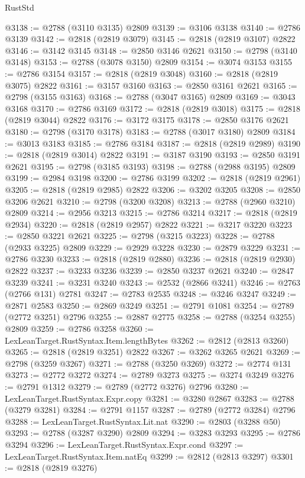 \begin{lexlean}{RustStd}
\begin{coremodule}
@3138 := @2788 (@3110 @3135) @2809
@3139 := @3106 @3138
@3140 := @2786 @3139
@3142 := @2818 (@2819 @3079)
@3145 := @2818 (@2819 @3107) @2822
@3146 := @3142 @3145
@3148 := @2850 @3146 @2621
@3150 := @2798 (@3140 @3148)
@3153 := @2788 (@3078 @3150) @2809
@3154 := @3074 @3153
@3155 := @2786 @3154
@3157 := @2818 (@2819 @3048)
@3160 := @2818 (@2819 @3075) @2822
@3161 := @3157 @3160
@3163 := @2850 @3161 @2621
@3165 := @2798 (@3155 @3163)
@3168 := @2788 (@3047 @3165) @2809
@3169 := @3043 @3168
@3170 := @2786 @3169
@3172 := @2818 (@2819 @3018)
@3175 := @2818 (@2819 @3044) @2822
@3176 := @3172 @3175
@3178 := @2850 @3176 @2621
@3180 := @2798 (@3170 @3178)
@3183 := @2788 (@3017 @3180) @2809
@3184 := @3013 @3183
@3185 := @2786 @3184
@3187 := @2818 (@2819 @2989)
@3190 := @2818 (@2819 @3014) @2822
@3191 := @3187 @3190
@3193 := @2850 @3191 @2621
@3195 := @2798 (@3185 @3193)
@3198 := @2788 (@2988 @3195) @2809
@3199 := @2984 @3198
@3200 := @2786 @3199
@3202 := @2818 (@2819 @2961)
@3205 := @2818 (@2819 @2985) @2822
@3206 := @3202 @3205
@3208 := @2850 @3206 @2621
@3210 := @2798 (@3200 @3208)
@3213 := @2788 (@2960 @3210) @2809
@3214 := @2956 @3213
@3215 := @2786 @3214
@3217 := @2818 (@2819 @2934)
@3220 := @2818 (@2819 @2957) @2822
@3221 := @3217 @3220
@3223 := @2850 @3221 @2621
@3225 := @2798 (@3215 @3223)
@3228 := @2788 (@2933 @3225) @2809
@3229 := @2929 @3228
@3230 := @2879 @3229
@3231 := @2786 @3230
@3233 := @2818 (@2819 @2880)
@3236 := @2818 (@2819 @2930) @2822
@3237 := @3233 @3236
@3239 := @2850 @3237 @2621
@3240 := @2847 @3239
@3241 := @3231 @3240
@3243 := @2532 (@2866 @3241)
@3246 := @2763 (@2766 @131) @2781
@3247 := @2783 @2535
@3248 := @3246 @3247
@3249 := @2871 @2583
@3250 := @2869 @3249
@3251 := @2791 @1081
@3254 := @2789 (@2772 @3251) @2796
@3255 := @2887 @2775
@3258 := @2788 (@3254 @3255) @2809
@3259 := @2786 @3258
@3260 := LexLeanTarget.RustSyntax.Item.lengthBytes
@3262 := @2812 (@2813 @3260)
@3265 := @2818 (@2819 @3251) @2822
@3267 := @3262 @3265 @2621
@3269 := @2798 (@3259 @3267)
@3271 := @2788 (@3250 @3269)
@3272 := @2774 @131
@3273 := @2772 @3272
@3274 := @2789 @3273
@3275 := @3274 @3249
@3276 := @2791 @1312
@3279 := @2789 (@2772 @3276) @2796
@3280 := LexLeanTarget.RustSyntax.Expr.copy
@3281 := @3280 @2867
@3283 := @2788 (@3279 @3281)
@3284 := @2791 @1157
@3287 := @2789 (@2772 @3284) @2796
@3288 := LexLeanTarget.RustSyntax.Lit.nat
@3290 := @2803 (@3288 @50)
@3293 := @2788 (@3287 @3290) @2809
@3294 := @3283 @3293
@3295 := @2786 @3294
@3296 := LexLeanTarget.RustSyntax.Expr.cond
@3297 := LexLeanTarget.RustSyntax.Item.natEq
@3299 := @2812 (@2813 @3297)
@3301 := @2818 (@2819 @3276)

\end{coremodule}
\end{lexlean}
